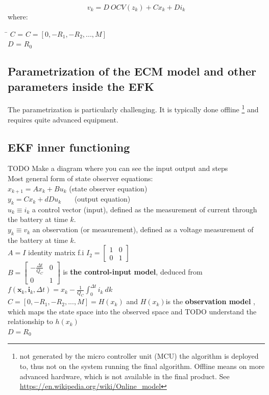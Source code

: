 \begin{equation}
{v}_{k} = {D} \ {OCV}({z}_{k}) + C {x}_{k}  +  D {i}_{k}   %
\end{equation}
where:
\begin{tabbing}
\phantom{$v(t)  \  $}\= \kill
$C$\> =   $C= [0, -R_1, -R_2, ..., M] $ \\
$D$\> = $R_0 $    \\
\end{tabbing}

\subsection{Parametrization of the ECM model and other parameters inside the EFK}
\label{Parametrization}

The parametrization is particularly challenging. It is typically done offline \footnote{not generated by the micro controller unit (MCU) the algorithm is deployed to, thus not on the system running the final algorithm. Offline means on more advanced hardware, which is not available in the final product. See \url{https://en.wikipedia.org/wiki/Online_model} } and requires quite advanced equipment.


\subsection{EKF inner functioning }
 
TODO Make a diagram where you can see the input output and steps\\


Most general form of  state observer equations: \\
$ x_{k+1}=Ax_{k}+Bu_{k} $ (state observer equation) \\
$ y_{k}=Cx_{k}+dDu_{k} $ \ \ \  (output equation)\\ 

$u_{k} \equiv i_{k}$ a control vector (input), defined as the measurement of current through the battery at time $k$. \\ 
$y_{k} \equiv v_{k}$ an observation (or measurement), defined as a voltage measurement of the battery at time $k$. \\
$A = I$  identity matrix f.i $I_{2}=\begin{bmatrix}1&0\\0&1\end{bmatrix}$ \\
$B = \begin{bmatrix}-\frac{\Delta t}{{Q_{C}}}&0\\0&1\end{bmatrix} $  is \textbf{the control-input model}, deduced from  $f({\boldsymbol {x}}_{k},{\boldsymbol {i}}_{k},\Delta t) =  {x}_{k} - \frac{1}{{Q_{C}}}\int_{0}^{\Delta t} {i_{k}\ dk} $ \\
$ C = [0, -R_1, -R_2, ..., M] = H(x_k) $ and $H(x_k) $is the \textbf{observation model} , which maps the state space into the observed space and TODO understand the relationship to $ h(x_k)$ \\ 
$ D = R_0 $ \\


